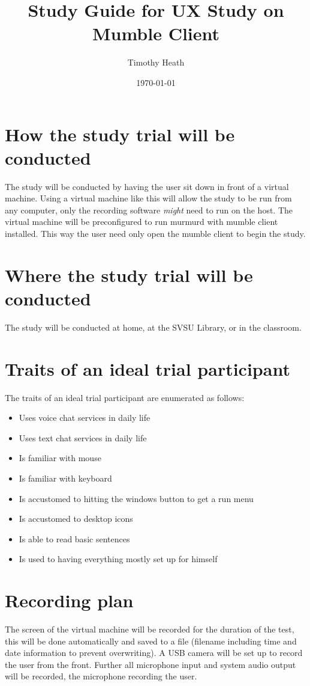 \documentclass{article}
\title{Study Guide for UX Study on Mumble Client}
\author{Timothy Heath}
\date{\today}
\begin{document}
    \maketitle
    \tableofcontents
    \section{How the study trial will be conducted}
    The study will be conducted by having the user sit down in front of a virtual machine.
    Using a virtual machine like this will allow the study to be run from any computer, only the recording software \emph{might}
    need to run on the host. The virtual machine will be preconfigured to run murmurd with mumble client installed.
    This way the user need only open the mumble client to begin the study.
    \section{Where the study trial will be conducted}
    The study will be conducted at home, at the SVSU Library, or in the classroom.
    \section{Traits of an ideal trial participant}
    The traits of an ideal trial participant are enumerated as follows:
    \begin{itemize}
        \item Uses voice chat services in daily life
        \item Uses text chat services in daily life
        \item Is familiar with mouse
        \item Is familiar with keyboard
        \item Is accustomed to hitting the windows button to get a run menu
        \item Is accustomed to desktop icons
        \item Is able to read basic sentences
        \item Is used to having everything mostly set up for himself
    \end{itemize}
    \section{Recording plan}
    The screen of the virtual machine will be recorded for the duration of the test, this will
    be done automatically and saved to a file (filename including time and date information to
    prevent overwriting). A USB camera will be set up to record the user from the front. Further
    all microphone input and system audio output will be recorded, the microphone recording the user.
\end{document}
